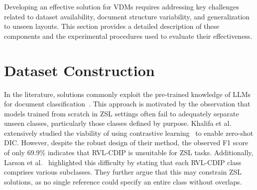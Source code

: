Developing an effective solution for \glspl{VDM} requires addressing key challenges related to dataset availability, document structure variability, and generalization to unseen layouts. This section provides a detailed description of these components and the experimental procedures used to evaluate their effectiveness. 


\section{Dataset Construction}
\label{sec:method_dataset}


In the literature, solutions commonly exploit the pre-trained knowledge of \glspl{LLM} for document classification~\cite{sinha_cica_2024,scius-bertrand_zero-shot_2025}. This approach is motivated by the observation that models trained from scratch in \gls{ZSL} settings often fail to adequately separate unseen classes, particularly those classes defined by purpose. Khalifa et al.~\cite{khalifa_contrastive_2023} extensively studied the viability of using contrastive learning~\cite{chopra_learning_2005} to enable zero-shot \gls{DIC}. However, despite the robust design of their method, the observed F1 score of only 69.9\% indicates that \gls{RVL-CDIP} is unsuitable for \gls{ZSL} tasks. Additionally, Larson et al.~\cite{larson_evaluation_2023} highlighted this difficulty by stating that each \gls{RVL-CDIP} class comprises various subclasses. They further argue that this may constrain \gls{ZSL} solutions, as no single reference could specify an entire class without overlaps.


